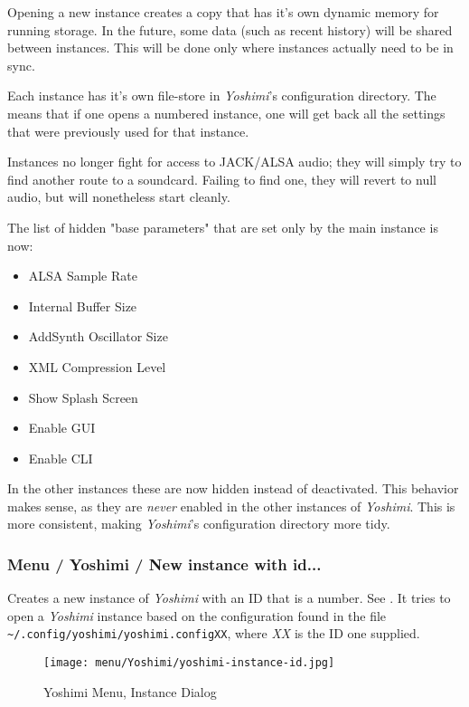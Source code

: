    Opening a new instance creates a copy that has it's own dynamic memory for
   running storage. In the future, some data (such as recent history) will be
   shared between instances. This will be done only where instances actually
   need to be in sync.

   Each instance has it's own file-store in \textsl{Yoshimi}'s configuration
   directory. The means that if one opens a numbered instance, one will get
   back all the settings that were previously used for that instance.

   Instances no longer fight for access to JACK/ALSA audio; they will simply
   try to find another route to a soundcard. Failing to find one,
   they will revert to null audio, but will nonetheless start cleanly.

   The list of hidden "base parameters" that are set only by the main instance is
   now:

   \begin{itemize}
      \item ALSA Sample Rate
      \item Internal Buffer Size
      \item AddSynth Oscillator Size
      \item XML Compression Level
      \item Show Splash Screen
      \item Enable GUI
      \item Enable CLI
   \end{itemize}

   In the other instances these are now hidden instead of deactivated.  This
   behavior makes sense, as they are \textsl{never} enabled in the other
   instances of \textsl{Yoshimi}. This is more consistent, making
   \textsl{Yoshimi}'s configuration directory more tidy.

\subsubsection{Menu / Yoshimi / New instance with id...}
\label{subsubsec:menu_yoshimi_new_instance_with_id}

   Creates a new instance of \textsl{Yoshimi}
   with an ID that is a number.
   See .
   It tries to open a \textsl{Yoshimi} instance based on the configuration
   found in the file
   \texttt{\textasciitilde/.config/\-yoshimi/\-yoshimi.configXX}, where
   \textsl{XX} is the ID one supplied.

\begin{figure}[H]
   \centering 
   \texttt{[image: menu/Yoshimi/yoshimi-instance-id.jpg]}
   \caption{Yoshimi Menu, Instance Dialog}
   \label{fig:yoshimi_instance_dialog}
\end{figure}

